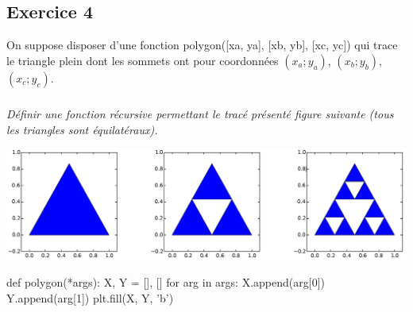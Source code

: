 \documentclass[10pt,fleqn]{book} %
\begin{document}
\begin{multicols}{2}
%
%
%


\section*{Exercice 4}
\setcounter{subparagraph}{0}

On suppose disposer d’une fonction \textsf{polygon([xa, ya], [xb, yb], [xc, yc])} qui trace le
triangle plein dont les sommets ont pour coordonnées $(x_a;y_a)$, $(x_b;y_b)$, $(x_c;y_c)$. 
\subparagraph{}
\textit{Définir une fonction récursive permettant le tracé présenté figure suivante (tous les triangles sont équilatéraux).}

\begin{center}
\includegraphics[width=.95\linewidth]{images/fig_04}
\end{center}

\ifprof
\begin{corrige}
\begin{python}
def polygon(*args):
    X, Y = [], []
    for arg in args:
        X.append(arg[0])
        Y.append(arg[1])
    plt.fill(X, Y, 'b')
    

\end{python}
\end{corrige}
\end{multicols}
\end{document}
